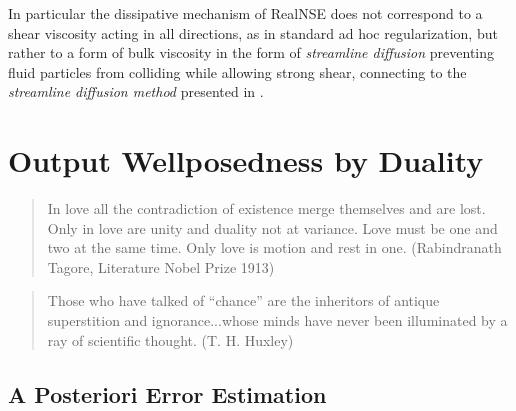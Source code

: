 In particular
the dissipative mechanism of RealNSE does not correspond to a
shear viscosity acting in all directions, 
as in standard ad hoc regularization, but rather to a form of 
bulk viscosity in the form of \emph{streamline diffusion}
preventing fluid particles from colliding while allowing strong shear,
connecting to the \emph{streamline diffusion method}  
presented in \cite{cde}.      









\chapter{Output Wellposedness by Duality}

\small
\begin{quote} In love all the contradiction of existence merge themselves 
and are lost. Only in love are unity and duality not at variance. 
Love must be one and two at the same time. Only love is motion and rest 
in one. (Rabindranath Tagore, Literature Nobel Prize 1913)
\end{quote}

\begin{quote}
Those who have talked of ``chance'' are the
inheritors of antique superstition and ignorance...whose minds have never
been illuminated by a ray of scientific thought. (T. H. Huxley)
\end{quote}
\normalsize


\section{A Posteriori Error Estimation} 

